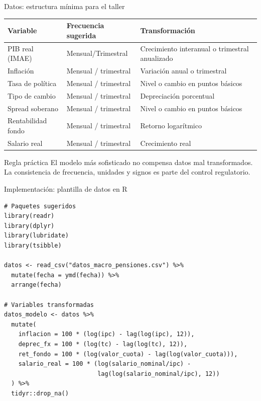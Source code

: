 \documentclass[10pt,aspectratio=169]{beamer}
\begin{document}
\begin{frame}{Datos: estructura mínima para el taller}
\begin{table}
\small
\begin{tabular}{lll}
\toprule
Variable & Frecuencia sugerida & Transformación \\
\midrule
PIB real (IMAE) & Mensual/Trimestral & Crecimiento interanual o trimestral anualizado \\
Inflación & Mensual / trimestral & Variación anual o trimestral \\
Tasa de política & Mensual / trimestral & Nivel o cambio en puntos básicos \\
Tipo de cambio & Mensual / trimestral & Depreciación porcentual \\
Spread soberano & Mensual / trimestral & Nivel o cambio en puntos básicos \\
Rentabilidad fondo & Mensual / trimestral & Retorno logarítmico \\
Salario real & Mensual / trimestral & Crecimiento real \\
\bottomrule
\end{tabular}
\end{table}

\begin{block}{Regla práctica}
El modelo más sofisticado no compensa datos mal transformados. La consistencia de frecuencia, unidades y signos es parte del control regulatorio.
\end{block}
\end{frame}

\begin{frame}[fragile]{Implementación: plantilla de datos en R}
\begin{lstlisting}
# Paquetes sugeridos
library(readr)
library(dplyr)
library(lubridate)
library(tsibble)

datos <- read_csv("datos_macro_pensiones.csv") %>%
  mutate(fecha = ymd(fecha)) %>%
  arrange(fecha)

# Variables transformadas
datos_modelo <- datos %>%
  mutate(
    inflacion = 100 * (log(ipc) - lag(log(ipc), 12)),
    deprec_fx = 100 * (log(tc) - lag(log(tc), 12)),
    ret_fondo = 100 * (log(valor_cuota) - lag(log(valor_cuota))),
    salario_real = 100 * (log(salario_nominal/ipc) -
                          lag(log(salario_nominal/ipc), 12))
  ) %>%
  tidyr::drop_na()
\end{lstlisting}
\end{frame}
\end{document}
